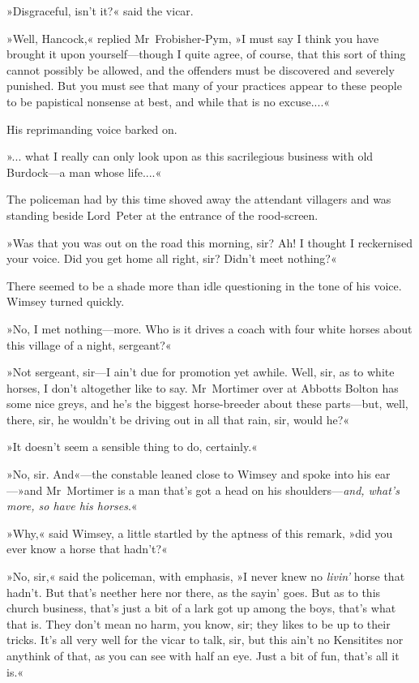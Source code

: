 »Disgraceful, isn't it?« said the vicar.

»Well, Hancock,« replied Mr~Frobisher-Pym, »I must say I think you have brought it upon yourself—though I quite agree, of course, that this sort of thing cannot possibly be allowed, and the offenders must be discovered and severely punished. But you must see that many of your practices appear to these people to be papistical nonsense at best, and while that is no excuse....«

His reprimanding voice barked on.

»... what I really can only look upon as this sacrilegious business with old Burdock—a man whose life....«

The policeman had by this time shoved away the attendant villagers and was standing beside Lord~Peter at the entrance of the rood-screen.

»Was that you was out on the road this morning, sir? Ah! I thought I reckernised your voice. Did you get home all right, sir? Didn't meet nothing?«

There seemed to be a shade more than idle questioning in the tone of his voice. Wimsey turned quickly.

»No, I met nothing—more. Who is it drives a coach with four white horses about this village of a night, sergeant?«

»Not sergeant, sir—I ain't due for promotion yet awhile. Well, sir, as to white horses, I don't altogether like to say. Mr~Mortimer over at Abbotts Bolton has some nice greys, and he's the biggest horse-breeder about these parts—but, well, there, sir, he wouldn't be driving out in all that rain, sir, would he?«

»It doesn't seem a sensible thing to do, certainly.«

»No, sir. And«—the constable leaned close to Wimsey and spoke into his ear—»and Mr~Mortimer is a man that's got a head on his shoulders—\textit{and, what's more, so have his horses}.«

»Why,« said Wimsey, a little startled by the aptness of this remark, »did you ever know a horse that hadn't?«

»No, sir,« said the policeman, with emphasis, »I never knew no \textit{livin'} horse that hadn't. But that's neether here nor there, as the sayin' goes. But as to this church business, that's just a bit of a lark got up among the boys, that's what that is. They don't mean no harm, you know, sir; they likes to be up to their tricks. It's all very well for the vicar to talk, sir, but this ain't no Kensitites nor anythink of that, as you can see with half an eye. Just a bit of fun, that's all it is.«

